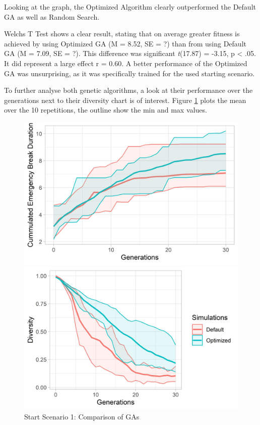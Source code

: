 Looking at the graph, the Optimized Algorithm clearly outperformed the Default GA as well as Random Search.

Welchs T Test shows a clear result, stating that on average greater fitness is achieved by using Optimized GA (M = 8.52, SE = ?) than from using Default GA (M = 7.09, SE = ?). This difference was significant \textit{t}(17.87) = -3.15, p < .05. It did represent a large effect r = 0.60.
A better performance of the Optimized GA was unsurprising, as it was specifically trained for the used starting scenario.


To further analyse both genetic algorithms, a look at their performance over the generations next to their diversity chart is of interest. Figure \ref{figure:sim_1_ga_comparison} plots the mean over the 10 repetitions, the outline show the min and max values.

\begin{figure}[ht] 
	\label{figure:sim_1_ga_comparison}
	\begin{minipage}[b]{0.5\linewidth}
		\centering
		\includegraphics[width=1\linewidth]{simulations/evaluation/plots/sim_1_ga_generations} 
	\end{minipage}%
	\begin{minipage}[b]{0.5\linewidth}
		\centering
		\includegraphics[width=1\linewidth]{simulations/evaluation/plots/sim_1_ga_diversity} 
	\end{minipage} 
	\caption{Start Scenario 1: Comparison of GAs}
\end{figure}

